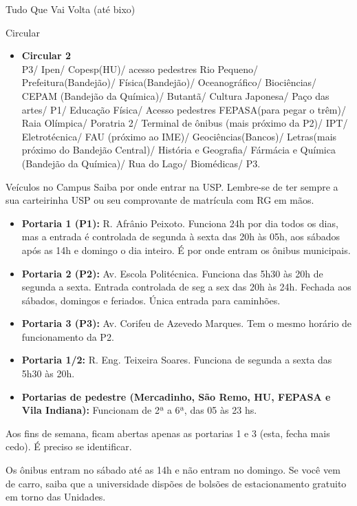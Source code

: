 \begin{secao}{Tudo Que Vai Volta (até bixo)}
\begin{subsecao}{Circular}
\begin{itemize}
  \item {\bf Circular 2}\\
    P3/ Ipen/ Copesp(HU)/ acesso pedestres Rio Pequeno/
    Prefeitura(Bandejão)/ Física(Bandejão)/ Oceanográfico/ Biociências/ CEPAM
    (Bandejão da Química)/ Butantã/ Cultura Japonesa/ Paço das artes/
    P1/ Educação Física/ Acesso pedestres FEPASA(para pegar o trêm)/ Raia
    Olímpica/ Poratria 2/ Terminal de ônibus (mais próximo da P2)/ IPT/
    Eletrotécnica/ FAU (próximo ao IME)/ Geociências(Bancos)/ Letras(mais
    próximo do Bandejão Central)/ História e Geografia/ Fármácia e Química
    (Bandejão da Química)/ Rua do Lago/ Biomédicas/ P3.
\end{itemize}
\end{subsecao}

\begin{subsecao}{Veículos no Campus}
Saiba por onde entrar na USP. Lembre-se de ter sempre a sua carteirinha USP ou
seu comprovante de matrícula com RG em mãos. 
\begin{itemize}
  \item {\bf Portaria 1 (P1):} R. Afrânio Peixoto. Funciona 24h por dia todos os
    dias, mas a entrada é controlada de segunda à sexta das 20h às 05h, aos sábados
    após as 14h e domingo o dia inteiro. É por onde entram os ônibus municipais. 
    
  \item {\bf Portaria 2 (P2):} Av. Escola Politécnica. Funciona das 5h30 às 20h
    de segunda a sexta. Entrada controlada de seg a sex das 20h às 24h. Fechada
    aos sábados, domingos e feriados. Única entrada para caminhões. 
    
  \item {\bf Portaria 3 (P3):} Av. Corifeu de Azevedo Marques. Tem o mesmo horário
    de funcionamento da P2.

  \item {\bf Portaria 1/2:} R. Eng. Teixeira Soares. Funciona de segunda a sexta das 5h30 às 20h. 
    
  \item {\bf Portarias de pedestre (Mercadinho, São Remo, HU, FEPASA e
      Vila Indiana):} Funcionam de 2ª a 6ª, das 05 às 23 hs.

\end{itemize}

Aos fins de semana, ficam abertas apenas as portarias 1 e 3 (esta, fecha mais cedo). É preciso se identificar.

Os ônibus entram no sábado até as 14h e não entram no domingo. Se você vem de carro, saiba que a universidade dispões de bolsões de estacionamento
gratuito em torno das Unidades.


\end{subsecao}
\end{secao}
